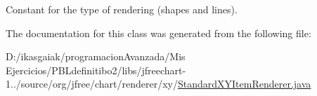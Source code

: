Constant for the type of rendering (shapes and lines). 

The documentation for this class was generated from the following file\+:\begin{DoxyCompactItemize}
\item 
D\+:/ikasgaiak/programacion\+Avanzada/\+Mis Ejercicios/\+P\+B\+Ldefinitibo2/libs/jfreechart-\/1../source/org/jfree/chart/renderer/xy/\mbox{\hyperlink{_standard_x_y_item_renderer_8java}{Standard\+X\+Y\+Item\+Renderer.\+java}}\end{DoxyCompactItemize}
